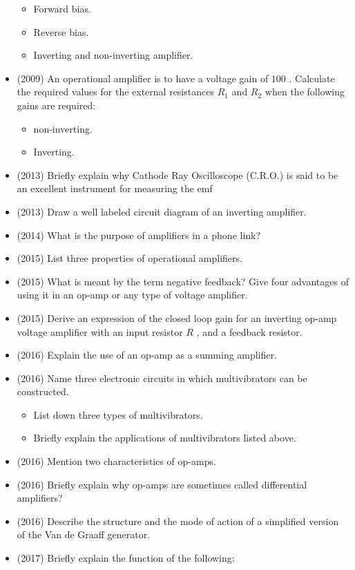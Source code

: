 \documentclass{article}
\begin{document}
\begin{itemize}
\begin{itemize}
\item Forward bias.
\item Reverse bias.
\item Inverting and non-inverting amplifier. 
\end{itemize}
\item (2009)  An operational amplifier is to have a voltage gain of $ 100$ .  Calculate the required values for the external resistances $ R_{1}$ and $ R_{2}$ when the following gains are required:\begin{itemize}
\item non-inverting.
\item Inverting.
\end{itemize}
\item (2013)  Briefly explain why Cathode Ray Oscilloscope (C.R.O.) is said to be an excellent instrument for measuring the emf 
\item (2013)  Draw a well labeled circuit diagram of an inverting amplifier.
\item (2014)  What is the purpose of amplifiers in a phone link? 
\item (2015)  List three properties of operational amplifiers.
\item (2015)  What is meant by the term negative feedback? Give four advantages of using it in an op-amp or any type of voltage amplifier.
\item (2015)  Derive an expression of the closed loop gain for an inverting op-amp voltage amplifier with an input resistor $ R$ , and a feedback resistor.
\item (2016)  Explain the use of an op-amp as a summing amplifier.
\item (2016)  Name three electronic circuits in which multivibrators can be constructed.\begin{itemize}
\item List down three types of multivibrators.
\item Briefly explain the applications of multivibrators listed above.
\end{itemize}
\item (2016)  Mention two characteristics of op-amps.
\item (2016)  Briefly explain why op-amps are sometimes called differential amplifiers?
\item (2016)  Describe the structure and the mode of action of a simplified version of the Van de Graaff generator.
\item (2017)  Briefly explain the function of the following:\begin{itemize}

\end{itemize}
\end{itemize}
\end{document}
